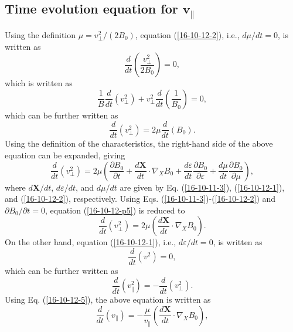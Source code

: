 \documentclass{article}
\begin{document}
\subsection{Time evolution equation for $\mathbf{v}_{\parallel}$}

Using the definition $\mu = v_{\perp}^2 / (2 B_0)$, equation
(\ref{16-10-12-2}), i.e., $d \mu / d t = 0$, is written as
\begin{equation}
  \frac{d}{d t} \left( \frac{v_{\perp}^2}{2 B_0} \right) = 0,
\end{equation}
which is written as
\begin{equation}
  \frac{1}{B}  \frac{d}{d t} (v_{\perp}^2) + v_{\perp}^2  \frac{d}{d t}
  (\frac{1}{B_0}) = 0,
\end{equation}
which can be further written as
\begin{equation}
  \frac{d}{d t} (v_{\perp}^2) = 2 \mu \frac{d}{d t} (B_0) .
\end{equation}
Using the definition of the characteristics, the right-hand side of the above
equation can be expanded, giving
\begin{equation}
  \label{16-10-12-p5} \frac{d}{d t} (v_{\perp}^2) = 2 \mu \left(
  \frac{\partial B_0}{\partial t} + \frac{d\mathbf{X}}{d t} \cdot \nabla_X B_0
  + \frac{d \varepsilon}{d t}  \frac{\partial B_0}{\partial \varepsilon} +
  \frac{d \mu}{d t}  \frac{\partial B_0}{\partial \mu} \right),
\end{equation}
where $d\mathbf{X}/ d t$, $d \varepsilon / d t$, and $d \mu / d t$ are given
by Eq. (\ref{16-10-11-3}), (\ref{16-10-12-1}), and (\ref{16-10-12-2}),
respectively. Using Eqs. (\ref{16-10-11-3})-(\ref{16-10-12-2}) and $\partial
B_0 / \partial t = 0$, equation (\ref{16-10-12-p5}) is reduced to
\begin{equation}
  \label{16-10-12-5} \frac{d}{d t} (v_{\perp}^2) = 2 \mu \left(
  \frac{d\mathbf{X}}{d t} \cdot \nabla_X B_0 \right) .
\end{equation}
On the other hand, equation (\ref{16-10-12-1}), i.e., $d \varepsilon / d t =
0$, is written as
\begin{equation}
  \frac{d}{d t} (v^2) = 0,
\end{equation}
which can be further written as
\begin{equation}
  \frac{d}{d t} (v^2_{\parallel}) = - \frac{d}{d t} (v^2_{\perp}) .
\end{equation}
Using Eq. (\ref{16-10-12-5}), the above equation is written as
\begin{equation}
  \label{16-10-12-p1} \frac{d}{d t} (v_{\parallel}) = -
  \frac{\mu}{v_{\parallel}} \left( \frac{d\mathbf{X}}{d t} \cdot \nabla_X B_0
  \right),
\end{equation}
\end{document}
